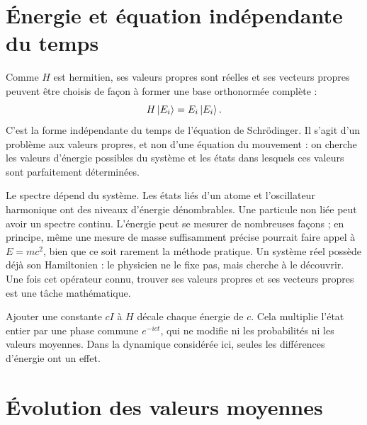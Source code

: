 \begin{classroomqa}\end{classroomqa}

\section{Énergie et équation indépendante du temps}

Comme \(H\) est hermitien, ses valeurs propres sont réelles et ses vecteurs propres peuvent être choisis de façon à former une base orthonormée complète :
\begin{equation}
H\left\lvert E_i\right\rangle=E_i\left\lvert E_i\right\rangle.
\label{eq:l5-time-independent}
\end{equation}
C’est la forme indépendante du temps de l’équation de Schr\"odinger. Il s’agit d’un problème aux valeurs propres, et non d’une équation du mouvement : on cherche les valeurs d’énergie possibles du système et les états dans lesquels ces valeurs sont parfaitement déterminées.

Le spectre dépend du système. Les états liés d’un atome et l’oscillateur harmonique ont des niveaux d’énergie dénombrables. Une particule non liée peut avoir un spectre continu. L’énergie peut se mesurer de nombreuses façons ; en principe, même une mesure de masse suffisamment précise pourrait faire appel à \(E=mc^2\), bien que ce soit rarement la méthode pratique. Un système réel possède déjà son Hamiltonien : le physicien ne le fixe pas, mais cherche à le découvrir. Une fois cet opérateur connu, trouver ses valeurs propres et ses vecteurs propres est une tâche mathématique.

Ajouter une constante \(cI\) à \(H\) décale chaque énergie de \(c\). Cela multiplie l’état entier par une phase commune \(e^{-ict}\), qui ne modifie ni les probabilités ni les valeurs moyennes. Dans la dynamique considérée ici, seules les différences d’énergie ont un effet.

\section{Évolution des valeurs moyennes}

